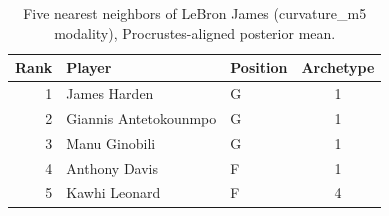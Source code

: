 \begin{table}[htbp]
  \centering\small
  \begin{tabular}{rllc}
    \toprule
    Rank & Player & Position & Archetype \\
    \midrule
    1 & James Harden & G & 1 \\
    2 & Giannis Antetokounmpo & G & 1 \\
    3 & Manu Ginobili & G & 1 \\
    4 & Anthony Davis & F & 1 \\
    5 & Kawhi Leonard & F & 4 \\
    \bottomrule
  \end{tabular}
  \caption{Five nearest neighbors of LeBron James (curvature_m5 modality), Procrustes-aligned posterior mean.}
  \label{tab:LeBron_James_neighbors_curvature_m5}
\end{table}

